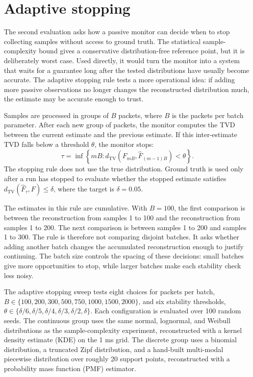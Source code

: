 \documentclass[a4paper,11pt]{report}
\begin{document}
\clearpage

\section{Adaptive stopping}
\label{sec:eval-adaptive}

The second evaluation asks how a passive monitor can decide when to stop collecting samples without access to ground truth. The statistical sample-complexity bound gives a conservative distribution-free reference point, but it is deliberately worst case. Used directly, it would turn the monitor into a system that waits for a guarantee long after the tested distributions have usually become accurate. The adaptive stopping rule tests a more operational idea: if adding more passive observations no longer changes the reconstructed distribution much, the estimate may be accurate enough to trust.

Samples are processed in groups of \(B\) packets, where \(B\) is the packets per batch parameter. After each new group of packets, the monitor computes the TVD between the current estimate and the previous estimate. If this inter-estimate TVD falls below a threshold \(\theta\), the monitor stops:
\[
\tau = \inf\left\{mB : d_{\mathrm{TV}}\left(\widehat{F}_{mB}, \widehat{F}_{(m-1)B}\right) < \theta\right\}.
\]
The stopping rule does not use the true distribution. Ground truth is used only after a run has stopped to evaluate whether the stopped estimate satisfies \(d_{\mathrm{TV}}(\widehat{F}_{\tau},F)\leq\delta\), where the target is \(\delta=0.05\).

The estimates in this rule are cumulative. With \(B=100\), the first comparison is between the reconstruction from samples 1 to 100 and the reconstruction from samples 1 to 200. The next comparison is between samples 1 to 200 and samples 1 to 300. The rule is therefore not comparing disjoint batches. It asks whether adding another batch changes the accumulated reconstruction enough to justify continuing. The batch size controls the spacing of these decisions: small batches give more opportunities to stop, while larger batches make each stability check less noisy.

The adaptive stopping sweep tests eight choices for packets per batch, \(B \in \{100,200,300,500,750,1000,1500,2000\}\), and six stability thresholds, \(\theta \in \{\delta/6,\delta/5,\delta/4,\delta/3,\delta/2,\delta\}\). Each configuration is evaluated over 100 random seeds. The continuous group uses the same normal, lognormal, and Weibull distributions as the sample-complexity experiment, reconstructed with a kernel density estimate (KDE) on the 1 ms grid. The discrete group uses a binomial distribution, a truncated Zipf distribution, and a hand-built multi-modal piecewise distribution over roughly 20 support points, reconstructed with a probability mass function (PMF) estimator.
\end{document}
